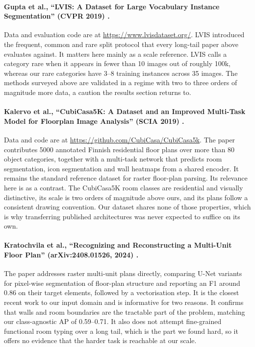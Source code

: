 \paragraph{Gupta et al., ``LVIS: A Dataset for Large Vocabulary Instance
Segmentation'' (CVPR 2019) \cite{gupta2019lvis}.} Data and evaluation code are
at \url{https://www.lvisdataset.org/}. LVIS introduced the frequent, common and
rare split protocol that every long-tail paper above evaluates against. It
matters here mainly as a scale reference. LVIS calls a category rare when it
appears in fewer than 10 images out of roughly 100k, whereas our rare categories
have 3--8 training instances across 35 images. The methods surveyed above are
validated in a regime with two to three orders of magnitude more data, a caution
the results section returns to.

\paragraph{Kalervo et al., ``CubiCasa5K: A Dataset and an Improved Multi-Task
Model for Floorplan Image Analysis'' (SCIA 2019)
\cite{kalervo2019cubicasa5k}.} Data and code are at
\url{https://github.com/CubiCasa/CubiCasa5k}. The paper contributes 5000
annotated Finnish residential floor plans over more than 80 object categories,
together with a multi-task network that predicts room segmentation, icon
segmentation and wall heatmaps from a shared encoder. It remains the standard
reference dataset for raster floor-plan parsing. Its relevance here is as a
contrast. The CubiCasa5K room classes are residential and visually distinctive,
its scale is two orders of magnitude above ours, and its plans follow a
consistent drawing convention. Our dataset shares none of those properties,
which is why transferring published architectures was never expected to suffice
on its own.

\paragraph{Kratochvila et al., ``Recognizing and Reconstructing a Multi-Unit
Floor Plan'' (arXiv:2408.01526, 2024) \cite{kratochvila2024multiunit}.} The
paper addresses raster multi-unit plans directly, comparing U-Net variants for
pixel-wise segmentation of floor-plan structure and reporting an F1 around 0.86
on their target elements, followed by a vectorisation step. It is the closest
recent work to our input domain and is informative for two reasons. It confirms
that walls and room boundaries are the tractable part of the problem, matching
our class-agnostic AP of 0.59--0.71. It also does not attempt fine-grained
functional room typing over a long tail, which is the part we found hard, so it
offers no evidence that the harder task is reachable at our scale.

